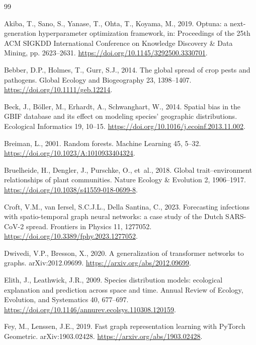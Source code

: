 \documentclass[a4paper,fleqn]{cas-sc}
\begin{document}
\begin{thebibliography}{99}

 Akiba, T., Sano, S., Yanase, T., Ohta, T., Koyama, M., 2019. Optuna: a next-generation hyperparameter optimization framework, in: Proceedings of the 25th ACM SIGKDD International Conference on Knowledge Discovery \& Data Mining, pp. 2623--2631. \url{https://doi.org/10.1145/3292500.3330701}.

 Bebber, D.P., Holmes, T., Gurr, S.J., 2014. The global spread of crop pests and pathogens. Global Ecology and Biogeography 23, 1398--1407. \url{https://doi.org/10.1111/geb.12214}.

 Beck, J., B\"oller, M., Erhardt, A., Schwanghart, W., 2014. Spatial bias in the GBIF database and its effect on modeling species' geographic distributions. Ecological Informatics 19, 10--15. \url{https://doi.org/10.1016/j.ecoinf.2013.11.002}.

 Breiman, L., 2001. Random forests. Machine Learning 45, 5--32. \url{https://doi.org/10.1023/A:1010933404324}.

 Bruelheide, H., Dengler, J., Purschke, O., et~al., 2018. Global trait--environment relationships of plant communities. Nature Ecology \& Evolution 2, 1906--1917. \url{https://doi.org/10.1038/s41559-018-0699-8}.

 Croft, V.M., van Iersel, S.C.J.L., Della Santina, C., 2023. Forecasting infections with spatio-temporal graph neural networks: a case study of the Dutch SARS-CoV-2 spread. Frontiers in Physics 11, 1277052. \url{https://doi.org/10.3389/fphy.2023.1277052}.

 Dwivedi, V.P., Bresson, X., 2020. A generalization of transformer networks to graphs. arXiv:2012.09699. \url{https://arxiv.org/abs/2012.09699}.

 Elith, J., Leathwick, J.R., 2009. Species distribution models: ecological explanation and prediction across space and time. Annual Review of Ecology, Evolution, and Systematics 40, 677--697. \url{https://doi.org/10.1146/annurev.ecolsys.110308.120159}.

 Fey, M., Lenssen, J.E., 2019. Fast graph representation learning with PyTorch Geometric. arXiv:1903.02428. \url{https://arxiv.org/abs/1903.02428}.


\end{thebibliography}
\end{document}

